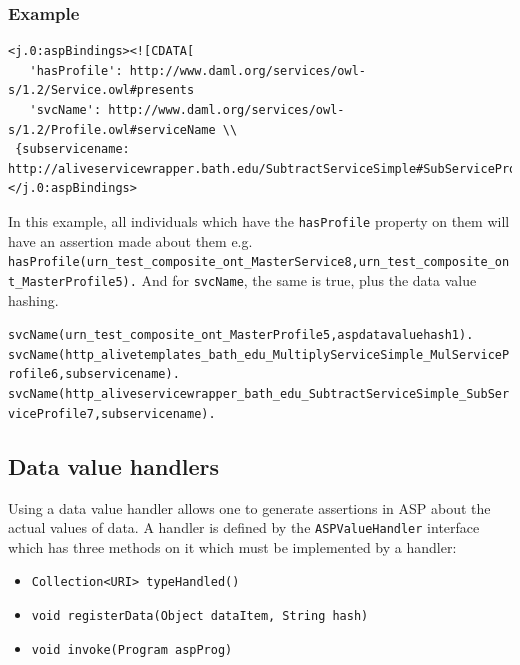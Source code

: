 \documentclass{llncs}
\begin{document}
 \subsubsection{Example}

 \begin{small}
 \begin{verbatim}
<j.0:aspBindings><![CDATA[
   'hasProfile': http://www.daml.org/services/owl-s/1.2/Service.owl#presents
   'svcName': http://www.daml.org/services/owl-s/1.2/Profile.owl#serviceName \\
 {subservicename: http://aliveservicewrapper.bath.edu/SubtractServiceSimple#SubServiceProfile}]]>
</j.0:aspBindings>
 \end{verbatim}
 \end{small}

 In this example, all individuals which have the \texttt{hasProfile} property on 
 them will have an assertion made about them e.g. \\
 \small{\texttt{hasProfile(urn\_test\_composite\_ont\_MasterService8,urn\_test\_composite\_ont\_MasterProfile5).}}
 And for \texttt{svcName}, the same is true, plus the data value hashing.\\
 \begin{small}
 \texttt{svcName(urn\_test\_composite\_ont\_MasterProfile5,aspdatavaluehash1).}\\
 \texttt{svcName(http\_alivetemplates\_bath\_edu\_MultiplyServiceSimple\_MulServiceProfile6,subservicename).}\\
 \texttt{svcName(http\_aliveservicewrapper\_bath\_edu\_SubtractServiceSimple\_SubServiceProfile7,subservicename).}\\
 \end{small}

\subsection{Data value handlers}
 Using a data value handler allows one to generate assertions in ASP about the 
 actual values of data. A handler is defined by the \texttt{ASPValueHandler} 
 interface which has three methods on it which must be implemented by a handler:
 \begin{itemize}
 	\item \texttt{Collection<URI> typeHandled()}
 	\item \texttt{void registerData(Object dataItem, String hash)}
 	\item \texttt{void invoke(Program aspProg)}
 \end{itemize}
\end{document}
